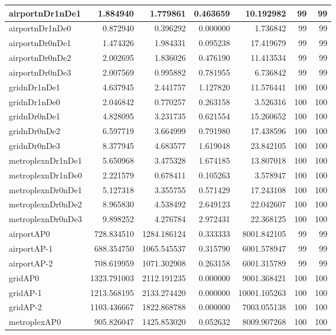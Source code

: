 \begin{longtable}{|l|r|r|r|r|r|r|}
\endlastfoot
airportnDr1nDe1 & 1.884940 & 1.779861 & 0.463659 & 10.192982 & 99 & 99 \\ \hline
airportnDr1nDe0 & 0.872940 & 0.396292 & 0.000000 & 1.736842 & 99 & 99 \\ \hline
airportnDr0nDe1 & 1.474326 & 1.984331 & 0.095238 & 17.419679 & 99 & 99 \\ \hline
airportnDr0nDe2 & 2.002695 & 1.836026 & 0.476190 & 11.413534 & 99 & 99 \\ \hline
airportnDr0nDe3 & 2.007569 & 0.995882 & 0.781955 & 6.736842 & 99 & 99 \\ \hline
gridnDr1nDe1 & 4.637945 & 2.441757 & 1.127820 & 11.576441 & 100 & 100 \\ \hline
gridnDr1nDe0 & 2.046842 & 0.770257 & 0.263158 & 3.526316 & 100 & 100 \\ \hline
gridnDr0nDe1 & 4.828095 & 3.231735 & 0.621554 & 15.260652 & 100 & 100 \\ \hline
gridnDr0nDe2 & 6.597719 & 3.664999 & 0.791980 & 17.438596 & 100 & 100 \\ \hline
gridnDr0nDe3 & 8.377945 & 4.683577 & 1.619048 & 23.842105 & 100 & 100 \\ \hline
metroplexnDr1nDe1 & 5.650968 & 3.475328 & 1.674185 & 13.807018 & 100 & 100 \\ \hline
metroplexnDr1nDe0 & 2.221579 & 0.678411 & 0.105263 & 3.578947 & 100 & 100 \\ \hline
metroplexnDr0nDe1 & 5.127318 & 3.355755 & 0.571429 & 17.243108 & 100 & 100 \\ \hline
metroplexnDr0nDe2 & 8.965830 & 4.538492 & 2.649123 & 22.042607 & 100 & 100 \\ \hline
metroplexnDr0nDe3 & 9.898252 & 4.276784 & 2.972431 & 22.368125 & 100 & 100 \\ \hline
airportAP0 & 728.834510 & 1284.186124 & 0.333333 & 8001.842105 & 99 & 99 \\ \hline
airportAP-1 & 688.354750 & 1065.545537 & 0.315790 & 6001.578947 & 99 & 99 \\ \hline
airportAP-2 & 708.619959 & 1071.302908 & 0.263158 & 6001.315789 & 99 & 99 \\ \hline
gridAP0 & 1323.791003 & 2112.191235 & 0.000000 & 9001.368421 & 100 & 100 \\ \hline
gridAP-1 & 1213.568195 & 2133.274420 & 0.000000 & 10001.105263 & 100 & 100 \\ \hline
gridAP-2 & 1103.436667 & 1822.868788 & 0.000000 & 7003.055138 & 100 & 100 \\ \hline
metroplexAP0 & 905.826047 & 1425.853020 & 0.052632 & 8009.907268 & 100 & 100 \\ \hline

\end{longtable}
